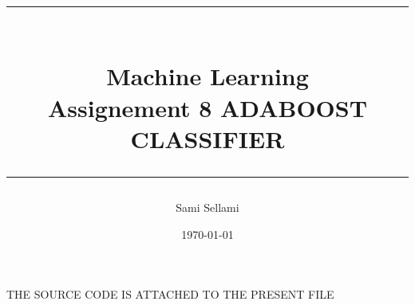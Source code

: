 \documentclass[12pt,a4paper]{report}
\title{
\rule{15cm}{1pt} \\
\Large {\bfseries Machine Learning} \\
\Large {\bfseries Assignement 8 ADABOOST CLASSIFIER}\\
\rule{15cm}{1pt}}
\author{Sami Sellami}
\date{\today}
\begin{document}
\setcounter{page}{1}
\setcounter{secnumdepth}{1}
	
\selectfont

\maketitle

\titlelabel{\thetitle)\quad}
\titlespacing{\chapter}{0cm}{0cm}{0cm}
\titlespacing{\section}{0.2cm}{0cm}{0cm}

THE SOURCE CODE IS ATTACHED TO THE PRESENT FILE 
\end{document}
